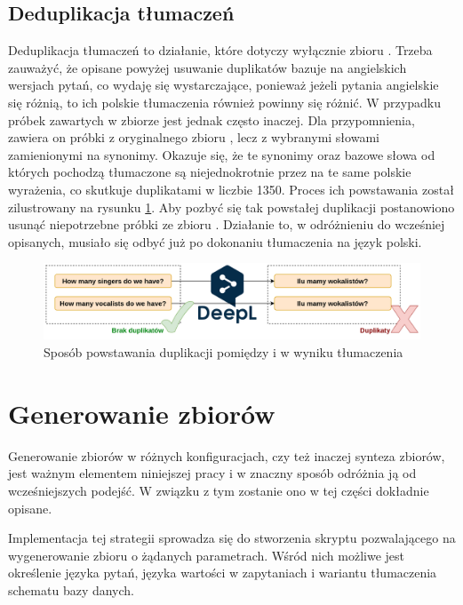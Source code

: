 \subsection{Deduplikacja tłumaczeń}
Deduplikacja tłumaczeń to działanie, które dotyczy wyłącznie zbioru . Trzeba zauważyć, że opisane powyżej usuwanie duplikatów bazuje na angielskich wersjach pytań, co wydaję się wystarczające, ponieważ jeżeli pytania angielskie się różnią, to ich polskie tłumaczenia również powinny się różnić. W przypadku próbek zawartych w zbiorze  jest jednak często inaczej. Dla przypomnienia, zawiera on próbki z oryginalnego zbioru , lecz z wybranymi słowami zamienionymi na synonimy. Okazuje się, że te synonimy oraz bazowe słowa od których pochodzą tłumaczone są niejednokrotnie przez  na te same polskie wyrażenia, co skutkuje duplikatami w liczbie 1350. Proces ich powstawania został zilustrowany na rysunku \ref{fig:deduplication-after-translation}. Aby pozbyć się tak powstałej duplikacji postanowiono usunąć niepotrzebne próbki ze zbioru . Działanie to, w odróżnieniu do wcześniej opisanych, musiało się odbyć już po dokonaniu tłumaczenia na język polski.

\begin{figure}[ht!]
  \centering
  \includegraphics[width=1.0\linewidth]{images/duplication_after_translation.png}
  \caption[Sposób powstawania duplikacji w wyniku tłumaczenia]{Sposób powstawania duplikacji pomiędzy  i  w wyniku tłumaczenia}
  \label{fig:deduplication-after-translation}
\end{figure}

\section{Generowanie zbiorów}
Generowanie zbiorów w różnych konfiguracjach, czy też inaczej synteza zbiorów, jest ważnym elementem niniejszej pracy i w znaczny sposób odróżnia ją od wcześniejszych podejść. W związku z tym zostanie ono w tej części dokładnie opisane.

Implementacja tej strategii sprowadza się do stworzenia skryptu pozwalającego na wygenerowanie zbioru o żądanych parametrach. Wśród nich możliwe jest określenie języka pytań, języka wartości w zapytaniach i wariantu tłumaczenia schematu bazy danych.

